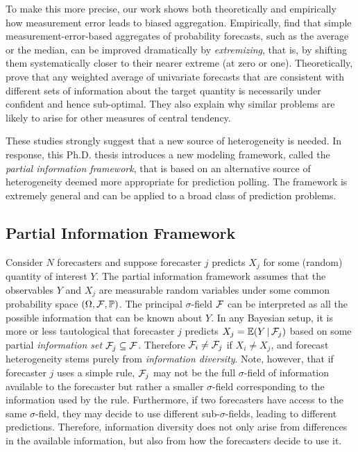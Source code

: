 \documentclass[10pt,twoside]{article}
\renewcommand{\P}{\mathbb{P}}
\newcommand{\E}{\mathbb{E}}
\theoremstyle{definition}
\theoremstyle{definition}
\def\F{{\cal F}}
\def\P{{\mathbb P}}
\def\E{{\mathbb E}}
\def\|{\, | \,}
\begin{document}
To make this more precise, our work shows both theoretically and empirically how measurement error leads to biased aggregation.
Empirically, \cite{satopaa, satopaa2014probability} find that 
simple measurement-error-based aggregates of probability forecasts, such as the average or the median, can be improved dramatically by \textit{extremizing}, that is, by shifting them systematically closer to their nearer extreme (at zero or one). Theoretically, 
\cite{satopaa2015combining}  prove that any weighted average of univariate forecasts that are consistent with different sets of information about the target quantity is necessarily under confident and hence sub-optimal. They also explain why similar problems are likely to arise for other measures of central tendency. 
 
 
These studies strongly suggest that a new source of heterogeneity is needed. In response, this Ph.D. thesis introduces a new modeling framework, called the \textit{partial information framework}, that is based on an alternative source of heterogeneity deemed more appropriate for prediction polling. The framework is extremely general and can be applied to a broad class of prediction problems.


 \vspace{-1em} \subsection{Partial Information Framework} \vspace{-0.5em}

Consider $N$ forecasters and suppose forecaster $j$ predicts $X_j$ for some (random) quantity of interest $Y$. The partial information framework assumes that the observables $Y$ and $X_j$ are measurable random variables under some common probability space $(\Omega, \F , \P)$. 
The principal $\sigma$-field $\F$ can be interpreted as all the possible information that can be known about $Y$. 
In any Bayesian setup, it is more or less tautological that
forecaster $j$ predicts $X_j = \E(Y \| \F_j)$ based on some partial \textit{information set} $\F_j \subseteq \F$. Therefore $\F_i \neq \F_j$ if $X_i \neq X_j$, and forecast heterogeneity stems purely from \textit{information diversity}.   Note, however, that if forecaster $j$ uses a simple rule, $\F_j$ may not be the full $\sigma$-field of information available to the forecaster but rather a smaller $\sigma$-field corresponding to the information used by the rule. Furthermore, if two forecasters have access to the same $\sigma$-field, they may decide to use different sub-$\sigma$-fields, leading to different predictions. 
Therefore,
information diversity does not only arise from differences in the available information, but also from how the forecasters decide to use it. 
\end{document}
